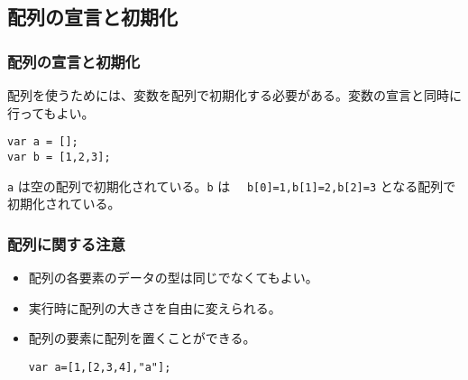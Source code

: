 \subsection{配列の宣言と初期化}
\begin{frame}[containsverbatim]
 \frametitle{配列の宣言と初期化}
配列を使うためには、変数を配列で初期化する必要がある。変数の宣言と同時に
行ってもよい。
\begin{Verbatim}
var a = [];
var b = [1,2,3];
\end{Verbatim}
\Verb+a+ は空の配列で初期化されている。\Verb+b+ は　
\Verb+b[0]=1,b[1]=2,b[2]=3+ となる配列で初期化されている。
\end{frame}
\begin{frame}[containsverbatim]
 \frametitle{配列に関する注意}
\begin{itemize}
 \item 配列の各要素のデータの型は同じでなくてもよい。
 \item 実行時に配列の大きさを自由に変えられる。
 \item 配列の要素に配列を置くことができる。
\begin{Verbatim}
var a=[1,[2,3,4],"a"];
\end{Verbatim}
\end{itemize}
\end{frame}
